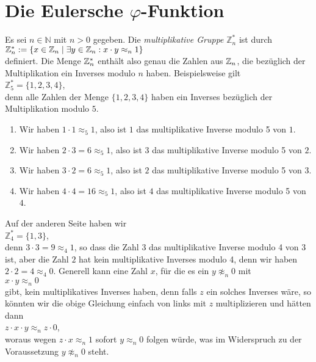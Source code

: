 \section{Die Eulersche $\varphi$-Funktion}
Es sei $n \in \mathbb{N}$ mit $n > 0$ gegeben.  Die \emph{multiplikative Gruppe} $\mathbb{Z}_n^*$
ist durch
\\[0.2cm]
\hspace*{1.3cm}
$\mathbb{Z}_{n}^* := \{ x \in \mathbb{Z}_{n} \mid \exists y \in \mathbb{Z}_{n} : x \cdot y \approx_n 1 \}$
\\[0.2cm]
definiert.  Die Menge $\mathbb{Z}_{n}^*$ enthält also genau die Zahlen aus $\mathbb{Z}_{n}$, die
bezüglich der Multiplikation ein Inverses modulo $n$ haben.  Beispielsweise gilt
\\[0.2cm]
\hspace*{1.3cm}
$\mathbb{Z}_5^* = \{ 1, 2, 3, 4 \}$,
\\[0.2cm]
denn alle Zahlen der Menge $\{ 1, 2, 3, 4 \}$ haben ein Inverses bezüglich der Multiplikation modulo
$5$.
\begin{enumerate}
\item Wir haben $1 \cdot 1 \approx_5 1$, also ist $1$ das multiplikative Inverse modulo 5 von $1$.
\item Wir haben $2 \cdot 3 = 6 \approx_5 1$, also ist $3$ das multiplikative Inverse modulo 5 von $2$.
\item Wir haben $3 \cdot 2 = 6 \approx_5 1$, also ist $2$ das multiplikative Inverse modulo 5 von $3$.
\item Wir haben $4 \cdot 4 = 16 \approx_5 1$, also ist $4$ das multiplikative Inverse modulo 5 von $4$.
\end{enumerate}
Auf der anderen Seite haben wir
\\[0.2cm]
\hspace*{1.3cm}
$\mathbb{Z}_4^* = \{ 1, 3 \}$,
\\[0.2cm]
denn $3 \cdot 3 = 9 \approx_4 1$, so dass die Zahl $3$ das multiplikative Inverse modulo 4 von $3$
ist, aber die Zahl $2$ hat kein multiplikative Inverses modulo 4, denn wir haben $2 \cdot 2 = 4 \approx_4 0$.
Generell kann eine Zahl $x$, für die es ein $y \not\approx_n 0$ mit
\\[0.2cm]
\hspace*{1.3cm}
$x \cdot y \approx_n 0$ 
\\[0.2cm]
gibt, kein multiplikatives Inverses haben, denn falls $z$ ein solches Inverses wäre, so könnten wir
die obige Gleichung einfach von links mit $z$ multiplizieren und hätten dann
\\[0.2cm]
\hspace*{1.3cm}
$z \cdot x \cdot y \approx_n z \cdot 0$,
\\[0.2cm]
woraus wegen $z \cdot x \approx_n 1$ sofort $y \approx_n 0$ folgen würde, was im Widerspruch zu der
Voraussetzung $y \not\approx_n 0$ steht.

